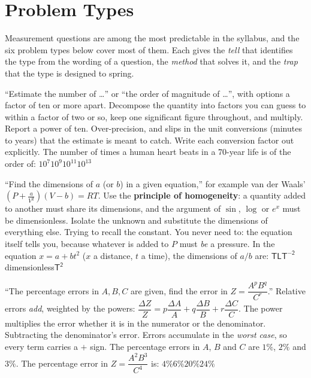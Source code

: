 \section{Problem Types}\label{sec:types1}
Measurement questions are among the most predictable in the syllabus, and the six problem types below
cover most of them. Each gives the \emph{tell} that identifies the type from the wording of a
question, the \emph{method} that solves it, and the \emph{trap} that the type is designed to spring.

{``Estimate the number of \ldots'' or ``the order of magnitude of \ldots'', with options a factor of ten
or more apart.}
{Decompose the quantity into factors you can guess to within a factor of two or so, keep one significant
figure throughout, and multiply. Report a power of ten.}
{Over-precision, and slips in the unit conversions (minutes to years) that the estimate is meant to
catch. Write each conversion factor out explicitly.}
{The number of times a human heart beats in a 70-year life is of the order of:}
{$10^{7}$}{$10^{9}$}{$10^{11}$}{$10^{13}$}

{``Find the dimensions of $a$ (or $b$) in a given equation,'' for example van der Waals' $\left(P+\frac{a}{V^2}\right)(V-b)=RT$.}
{Use the \textbf{principle of homogeneity}: a quantity added to another must share its dimensions, and
the argument of $\sin$, $\log$ or $e^x$ must be dimensionless. Isolate the unknown and substitute the
dimensions of everything else.}
{Trying to recall the constant. You never need to: the equation itself tells you, because whatever is
added to $P$ must \emph{be} a pressure.}
{In the equation $x=a+bt^2$ ($x$ a distance, $t$ a time), the dimensions of $a/b$ are:}
{$\mathsf{T}$}{$\mathsf{L T^{-2}}$}{dimensionless}{$\mathsf{T^2}$}

{``The percentage errors in $A,B,C$ are given, find the error in $Z=\dfrac{A^pB^q}{C^r}$.''}
{Relative errors \emph{add}, weighted by the powers:
$\dfrac{\Delta Z}{Z}=p\dfrac{\Delta A}{A}+q\dfrac{\Delta B}{B}+r\dfrac{\Delta C}{C}$. The power multiplies
the error whether it is in the numerator or the denominator.}
{Subtracting the denominator's error. Errors accumulate in the \emph{worst case}, so every term carries a
$+$ sign.}
{The percentage errors in $A$, $B$ and $C$ are $1\%$, $2\%$ and $3\%$. The percentage error in
$Z=\dfrac{A^2B^3}{C^4}$ is:}
{$4\%$}{$6\%$}{$20\%$}{$24\%$}


